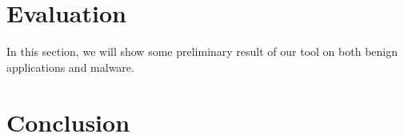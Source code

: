 \documentclass{article}
\begin{document}
\section{Evaluation}
\label{sec:eval}
In this section, we will show some preliminary result of our tool on both benign
applications and malware. 

\section{Conclusion}
\label{sec:conclude}


%
%


 
\end{document}
